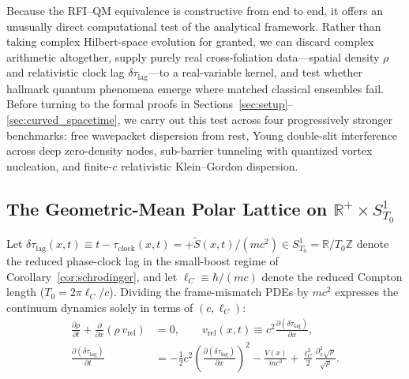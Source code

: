\documentclass[11pt, a4paper]{article}
\theoremstyle{definition}
\begin{document}
Because the RFI--QM equivalence is constructive from end to end, it offers an unusually direct computational test of the analytical framework. Rather than taking complex Hilbert-space evolution for granted, we can discard complex arithmetic altogether, supply purely real cross-foliation data---spatial density $\rho$ and relativistic clock lag $\delta\tau_{\text{lag}}$---to a real-variable kernel, and test whether hallmark quantum phenomena emerge where matched classical ensembles fail. Before turning to the formal proofs in Sections~\ref{sec:setup}--\ref{sec:curved_spacetime}, we carry out this test across four progressively stronger benchmarks: free wavepacket dispersion from rest, Young double-slit interference across deep zero-density nodes, sub-barrier tunneling with quantized vortex nucleation, and finite-$c$ relativistic Klein--Gordon dispersion.

\subsection{\texorpdfstring{The Geometric-Mean Polar Lattice on $\mathbb{R}^+ \times S^1_{T_0}$}{The Geometric-Mean Polar Lattice on R+ x S1}}
\label{sec:polar_lattice}

Let $\delta\tau_{\text{lag}}(x, t) \equiv t - \tau_{\text{clock}}(x, t) = +\tilde{S}(x, t)/(mc^2) \in S^1_{T_0} = \mathbb{R}/T_0\mathbb{Z}$ denote the reduced phase-clock lag in the small-boost regime of Corollary~\ref{cor:schrodinger}, and let $\ell_C \equiv \hbar/(mc)$ denote the reduced Compton length ($T_0 = 2\pi\ell_C / c$). Dividing the frame-mismatch PDEs by $mc^2$ expresses the continuum dynamics solely in terms of $(c, \ell_C)$:
\begin{align}
\frac{\partial \rho}{\partial t} + \frac{\partial}{\partial x}\left( \rho \, v_{\text{rel}} \right) &= 0, \qquad v_{\text{rel}}(x, t) \equiv c^2 \frac{\partial (\delta\tau_{\text{lag}})}{\partial x}, \label{eq:real_pde_continuity} \\
\frac{\partial (\delta\tau_{\text{lag}})}{\partial t} &= -\frac{1}{2} c^2 \left( \frac{\partial (\delta\tau_{\text{lag}})}{\partial x} \right)^2 - \frac{V(x)}{m c^2} + \frac{\ell_C^2}{2} \frac{\partial_x^2 \sqrt{\rho}}{\sqrt{\rho}}. \label{eq:real_pde_clock}
\end{align}
\end{document}
